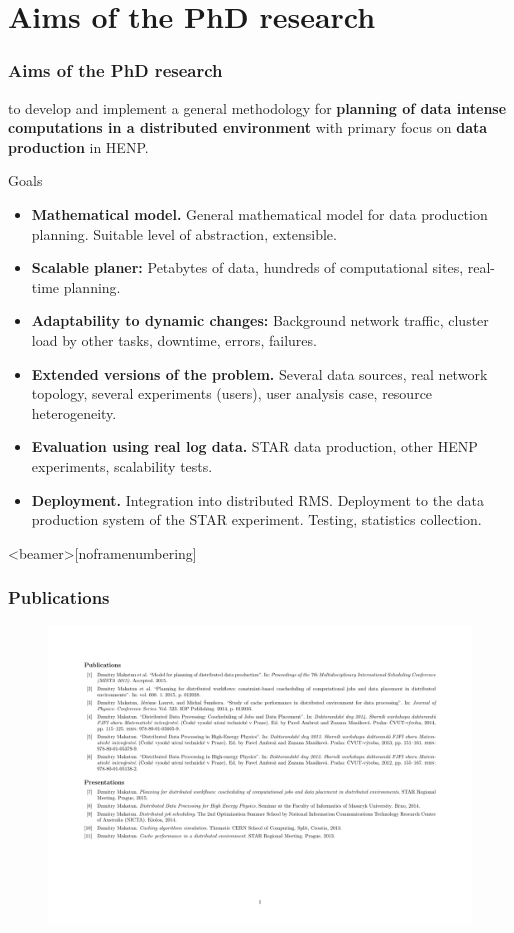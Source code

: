 \documentclass{beamer}
\begin{document}
\section{Aims of the PhD research}
\begin{frame}\frametitle{Aims of the PhD research}
\begin{footnotesize}
to develop and implement a general methodology for \textbf{planning of data intense computations in a distributed environment} with primary focus on \textbf{data production} in HENP. 
\begin{block}{Goals}
\begin{itemize}
\item \textbf{Mathematical model.} General mathematical model for data production planning. Suitable level of abstraction, extensible. 
\item \textbf{Scalable planer:} Petabytes of data, hundreds of computational sites, real-time planning.
\item \textbf{Adaptability to dynamic changes:} Background network traffic, cluster load by other tasks, downtime, errors, failures.
\item \textbf{Extended versions of the problem.} Several data sources, real network topology, several experiments (users), user analysis case, resource heterogeneity. 
\item \textbf{Evaluation using real log data.} STAR data production, other HENP experiments, scalability tests. 
\item \textbf{Deployment.} Integration into distributed RMS. Deployment to the data production system of the STAR experiment. Testing, statistics collection. 
\end{itemize}

\end{block}
\end{footnotesize}
\end{frame}

\begin{frame}<beamer>[noframenumbering]\frametitle{Publications }
\begin{figure}
	\begin{center}
		\centering
		\includegraphics[trim = 20mm 20mm 20mm 20mm,clip,width=\textwidth]{myref.pdf}
	\end{center}
\end{figure}	
\end{frame}

\begin{tiny}
\renewcommand*{\bibfont}{\tiny}
\printbibliography[notkeyword=my]
\end{tiny}
\end{document}
